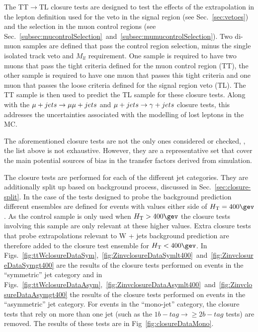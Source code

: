The TT$\rightarrow$TL closure tests are designed to test the effects
of the extrapolation in the lepton definition used for the veto in the
signal region (see Sec.~\ref{sec:vetoes}) and the selection in the muon control
regions (see
Sec.~\ref{subsec:mucontrolSelection}~and~\ref{subsec:mumucontrolSelection}).
Two di-muon samples are defined that pass the \mmj control region
selection, minus the single isolated track veto and $M_{ll}$
requirement. One sample is required to have two muons that pass the
tight criteria defined for the muon control region (TT), the other
sample is required to have one muon that passes this tight criteria
and one muon that passes the loose criteria defined for the signal
region veto (TL). The TT sample is then used to predict the TL
sample for these closure tests. Along with the $\mu + jets \rightarrow \mu\mu + jets$
and $\mu + jets \rightarrow \gamma + jets$ closure tests, this addresses the
uncertainties associated with the modelling of lost leptons in the MC.

The aforementioned closure tests are not the only ones considered or
checked, \ie, the list above is not exhaustive. However, they are a
representative set that cover the main potential sources of bias in
the transfer factors derived from simulation. 

The closure tests are performed for each of the different jet
categories. They are additionally split up based on background
process, discussed in Sec.~\ref{sec:closure-split}. In the case of the
tests designed to probe the \znunu background prediction different
ensembles are defined for events with values either side of
$\scalht=400\gev$. As the \gj control sample is only used when
$\scalht>400\gev$ the closure tests involving this sample are only
relevant at these higher \scalht values. Extra closure tests that
probe extrapolations relevant to W + jets background prediction are
therefore added to the \znunu closure test ensemble for
$\scalht<400\gev$. In
Figs.~\ref{fig:ttWclosureDataSym},~\ref{fig:ZinvclosureDataSymlt400}~and~\ref{fig:ZinvclosureDataSymgt400} are the results of the
closure tests performed on events in the ``symmetric'' jet category
and in
Figs.~\ref{fig:ttWclosureDataAsym},~\ref{fig:ZinvclosureDataAsymlt400}~and~\ref{fig:ZinvclosureDataAsymgt400} the results of the closure tests
performed on events in the ``asymmetric'' jet
category. For events in the ``mono-jet'' category, the closure tests
that rely on more than one jet (such as the $1 b-tag\rightarrow\geq 2
b-tag$ tests) are removed. The results of these tests are in
Fig~\ref{fig:closureDataMono}. 

